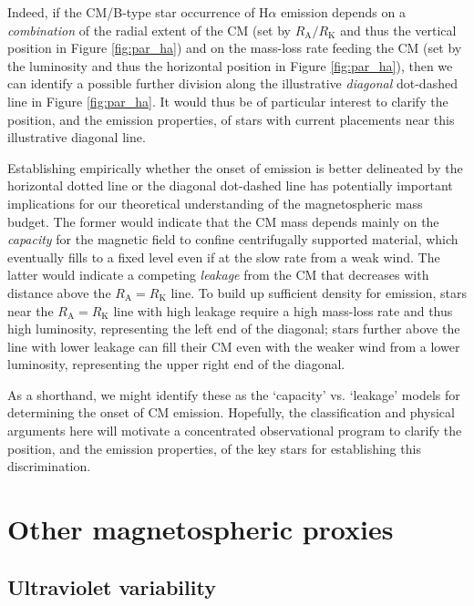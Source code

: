 \documentclass[useAMS,usenatbib]{mn2e}
\newcommand{\ra}{R_\mathrm{A}}
\newcommand{\rk}{R_\mathrm{K}}
\begin{document}
Indeed, if the CM/B-type star occurrence of H$\alpha$ emission depends on a {\em combination} of the radial extent of the CM (set by $\ra/\rk$ and thus the vertical position in Figure \ref{fig:par_ha}) and on the mass-loss rate feeding the CM (set by the luminosity and thus the horizontal position in Figure \ref{fig:par_ha}), then we can identify a possible further division along the illustrative {\em diagonal} dot-dashed line in Figure \ref{fig:par_ha}. 
It would thus be of particular interest to clarify the position, and the emission properties, of stars  with current placements near this illustrative diagonal line. 

Establishing empirically whether the onset of emission is better delineated by the horizontal dotted line or the diagonal dot-dashed line has potentially important implications for our theoretical understanding of the magnetospheric mass budget.
The former would indicate that the CM mass depends mainly on the {\em capacity} for the magnetic field to confine centrifugally supported material, which eventually fills to a fixed level even if at the slow rate from a weak wind.
The latter would indicate a competing {\em leakage} from the CM that decreases with distance above the $\ra=\rk$ line.
To build up sufficient density for emission, stars near the $\ra=\rk$ line with high leakage require a high mass-loss rate and thus high luminosity, representing the left end of the diagonal; stars further above the line with lower leakage can fill their CM even with the weaker wind from a lower luminosity, representing the upper right end of the diagonal.

As a shorthand, we might identify these as the `capacity' vs. `leakage' models for determining the onset of  CM emission.  Hopefully, the classification and physical arguments here will motivate a concentrated observational program to clarify the position, and the emission properties, of the key stars for establishing this discrimination.

\section{Other magnetospheric proxies}
\label{sec:other}

\subsection{Ultraviolet variability}
\label{sec:uv}
\end{document}
